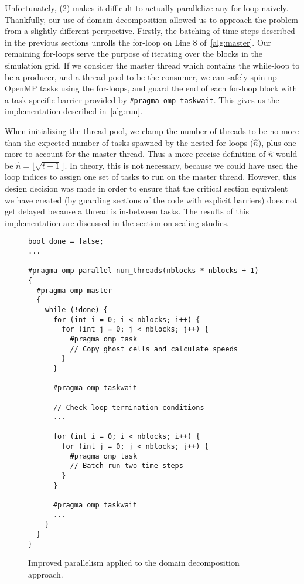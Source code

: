 \documentclass{scrartcl}
\begin{document}
  Unfortunately, (2) makes it difficult to actually parallelize any for-loop naively. Thankfully, our use of domain decomposition allowed us to approach the problem from a slightly different perspective. Firstly, the batching of time steps described in the previous sections unrolls the for-loop on Line 8 of~\autoref{alg:master}. Our remaining for-loops serve the purpose of iterating over the blocks in the simulation grid. If we consider the master thread which contains the while-loop to be a producer, and a thread pool to be the consumer, we can safely spin up OpenMP tasks using the for-loops, and guard the end of each for-loop block with a task-specific barrier provided by \texttt{\#pragma omp taskwait}. This gives us the implementation described in~\autoref{alg:run}.

  When initializing the thread pool, we clamp the number of threads to be no more than the expected number of tasks spawned by the nested for-loops ($\hat{n}$), plus one more to account for the master thread. Thus a more precise definition of $\hat{n}$ would be $\hat{n} = \lfloor\sqrt{t-1}\rfloor$. In theory, this is not necessary, because we could have used the loop indices to assign one set of tasks to run on the master thread. However, this design decision was made in order to ensure that the critical section equivalent we have created (by guarding sections of the code with explicit barriers) does not get delayed because a thread is in-between tasks. The results of this implementation are discussed in the section on scaling studies.

  \begin{figure}[p]
  \begin{lstlisting}
bool done = false;
...

#pragma omp parallel num_threads(nblocks * nblocks + 1)
{
  #pragma omp master
  {
    while (!done) {
      for (int i = 0; i < nblocks; i++) {
        for (int j = 0; j < nblocks; j++) {
          #pragma omp task
          // Copy ghost cells and calculate speeds
        }
      }

      #pragma omp taskwait

      // Check loop termination conditions
      ...

      for (int i = 0; i < nblocks; i++) {
        for (int j = 0; j < nblocks; j++) {
          #pragma omp task
          // Batch run two time steps
        }
      }

      #pragma omp taskwait
      ...
    }
  }
}
  \end{lstlisting}
  \caption{Improved parallelism applied to the domain decomposition approach.\label{alg:run}}
  \end{figure}
\end{document}
